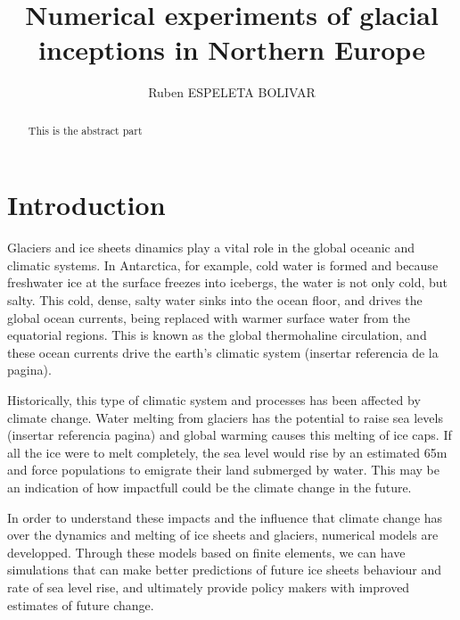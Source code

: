 \documentclass[a4paper,12pt]{article}
\title{Numerical experiments of glacial inceptions in Northern Europe}
\author{Ruben ESPELETA BOLIVAR}
\begin{document}
\renewcommand{\labelitemi}{$\bullet$}

\maketitle

\tableofcontents

\newpage

\begin{abstract}
	This is the abstract part
\end{abstract}
\pagebreak
\section{Introduction}

Glaciers and ice sheets dinamics play a vital role in the global oceanic and climatic systems. In Antarctica, for example, cold water is formed and because freshwater ice at the surface freezes into icebergs, the water is not only cold, but salty. This cold, dense, salty water sinks into the ocean floor, and drives the global ocean currents, being replaced with warmer surface water from the equatorial regions. This is known as the global thermohaline circulation, and these ocean currents drive the earth's climatic system (insertar referencia de la pagina).

Historically, this type of climatic system and processes has been affected by climate change. Water melting from glaciers has the potential to raise sea levels (insertar referencia pagina) and global warming causes this melting of ice caps. If all the ice were to melt completely, the sea level would rise by an estimated 65m \cite[]{morlighem2017bedmachine,haywood2011pliocene} and force populations to emigrate their land submerged by water. This may be an indication of how impactfull could be the climate change in the future.

In order to understand these impacts and the influence that climate change has over the dynamics and melting of ice sheets and glaciers, numerical models are developped. Through these models based on finite elements, we can have simulations that can make better predictions of future ice sheets behaviour and rate of sea level rise, and ultimately provide policy makers with improved estimates of future change.
\end{document}
